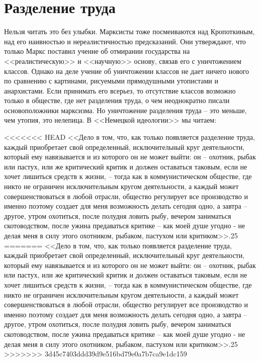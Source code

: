 \documentclass{book}
\begin{document}
\section{Разделение труда}

Нельзя читать это без улыбки. Марксисты тоже посмеивают­ся над Кропоткиным, над его наивностью и нереалистичностью предсказаний. Они утверждают, что только Маркс поставил учение об отмирании государства на <<реалистическую>> и <<науч­ную>> основу, связав его с уничтожением классов. Однако на деле учение об уничтожении классов не дает ничего нового по сравнению с картинами, рисуемыми прямодушными утописта­ми и анархистами. Если принимать его всерьез, то отсутствие классов возможно только в обществе, где нет разделения тру­да, о чем неоднократно писали основоположники марксизма. Но уничтожение разделения труда -- это меньше, чем утопия, это нелепица. В <<Немецкой идеологии>> мы читаем:

<<<<<<< HEAD
<<Дело в том, что, как только появляется разделение труда, каждый приобретает свой определенный, исключительный круг деятельности, который ему навязывается и из которого он не может выйти: он -- охотник, рыбак или пастух, или же критический критик и должен оставаться таковым, если не хочет лишиться средств к жизни, -- тогда как в коммунисти­ческом обществе, где никто не ограничен исключительным кругом деятельности, а каждый может совершенствоваться в любой отрасли, общество регулирует все производство и именно поэтому создает для меня возможность делать сегод­ня одно, а завтра -- другое, утром охотиться, после полудня ловить рыбу, вечером заниматься скотоводством, после ужина предаваться критике -- как моей душе угодно ‑ не делая ме­ня в силу этого охотником, рыбаком, пастухом или крити­ком>>.25
=======
<<Дело в том, что, как только появляется разделение труда, каждый приобретает свой определенный, исключительный круг деятельности, который ему навязывается и из которого он не может выйти: он -- охотник, рыбак или пастух, или же критический критик и должен оставаться таковым, если не хочет лишиться средств к жизни, -- тогда как в коммунисти­ческом обществе, где никто не ограничен исключительным кругом деятельности, а каждый может совершенствоваться в любой отрасли, общество регулирует все производство и именно поэтому создает для меня возможность делать сегод­ня одно, а завтра -- другое, утром охотиться, после полудня ловить рыбу, вечером заниматься скотоводством, после ужина предаваться критике -- как моей душе угодно - не делая ме­ня в силу этого охотником, рыбаком, пастухом или крити­ком>>.25
>>>>>>> 3d45c7403ddd39d9e516bd79e0a7b7ca9e1dc159
\end{document}
